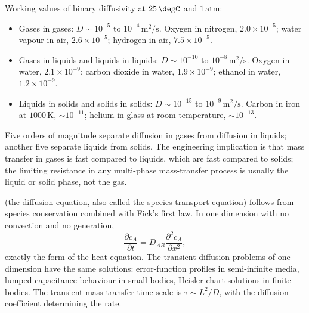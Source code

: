 Working values of binary diffusivity at $25\,\degC$ and $1\,\text{atm}$:

\begin{itemize}[leftmargin=*]
  \item Gases in gases: $D \sim 10^{-5}$ to $10^{-4}\,\text{m}^2/\text{s}$.
    Oxygen in nitrogen, $2.0 \times 10^{-5}$; water vapour in air,
    $2.6 \times 10^{-5}$; hydrogen in air, $7.5 \times 10^{-5}$.
  \item Gases in liquids and liquids in liquids: $D \sim 10^{-10}$ to
    $10^{-8}\,\text{m}^2/\text{s}$. Oxygen in water, $2.1 \times
    10^{-9}$; carbon dioxide in water, $1.9 \times 10^{-9}$; ethanol
    in water, $1.2 \times 10^{-9}$.
  \item Liquids in solids and solids in solids: $D \sim 10^{-15}$ to
    $10^{-9}\,\text{m}^2/\text{s}$. Carbon in iron at $1000\,\si{\kelvin}$,
    $\sim 10^{-11}$; helium in glass at room temperature, $\sim
    10^{-13}$.
\end{itemize}

Five orders of magnitude separate diffusion in gases from diffusion
in liquids; another five separate liquids from solids. The
engineering implication is that mass transfer in gases is fast
compared to liquids, which are fast compared to solids; the limiting
resistance in any multi-phase mass-transfer process is usually the
liquid or solid phase, not the gas.

 (the diffusion equation, also called the
species-transport equation) follows from species conservation
combined with Fick's first law. In one dimension with no convection
and no generation,
\[
\frac{\partial c_A}{\partial t} = D_{AB} \frac{\partial^2 c_A}{\partial
x^2},
\]
exactly the form of the heat equation. The transient diffusion
problems of one dimension have the same solutions: error-function
profiles in semi-infinite media, lumped-capacitance behaviour in
small bodies, Heisler-chart solutions in finite bodies. The transient
mass-transfer time scale is $\tau \sim L^2/D$, with the diffusion
coefficient determining the rate.

